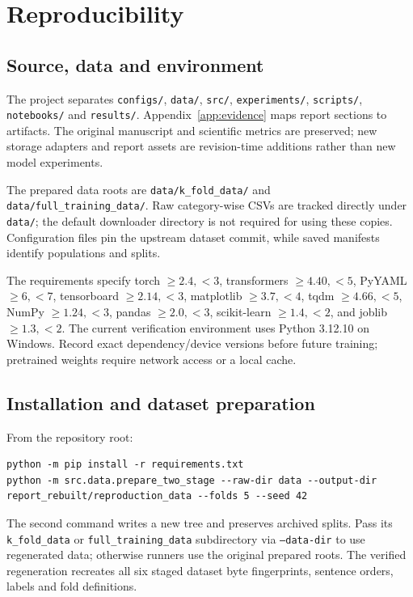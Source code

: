 \section{Reproducibility}
\subsection{Source, data and environment}
The project separates \texttt{configs/}, \texttt{data/}, \texttt{src/}, \texttt{experiments/}, \texttt{scripts/}, \texttt{notebooks/} and \texttt{results/}. Appendix~\ref{app:evidence} maps report sections to artifacts. The original manuscript and scientific metrics are preserved; new storage adapters and report assets are revision-time additions rather than new model experiments.

The prepared data roots are \texttt{data/k\_fold\_data/} and \texttt{data/full\_training\_data/}. Raw category-wise CSVs are tracked directly under \texttt{data/}; the default downloader directory is not required for using these copies. Configuration files pin the upstream dataset commit, while saved manifests identify populations and splits.

The requirements specify torch $\geq2.4,<3$, transformers $\geq4.40,<5$, PyYAML $\geq6,<7$, tensorboard $\geq2.14,<3$, matplotlib $\geq3.7,<4$, tqdm $\geq4.66,<5$, NumPy $\geq1.24,<3$, pandas $\geq2.0,<3$, scikit-learn $\geq1.4,<2$, and joblib $\geq1.3,<2$. The current verification environment uses Python 3.12.10 on Windows. Record exact dependency/device versions before future training; pretrained weights require network access or a local cache.

\subsection{Installation and dataset preparation}
From the repository root:
\begin{lstlisting}
python -m pip install -r requirements.txt
python -m src.data.prepare_two_stage --raw-dir data --output-dir report_rebuilt/reproduction_data --folds 5 --seed 42
\end{lstlisting}
The second command writes a new tree and preserves archived splits. Pass its \texttt{k\_fold\_data} or \texttt{full\_training\_data} subdirectory via \texttt{--data-dir} to use regenerated data; otherwise runners use the original prepared roots. The verified regeneration recreates all six staged dataset byte fingerprints, sentence orders, labels and fold definitions.


